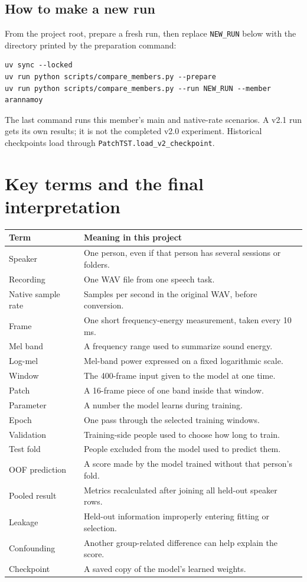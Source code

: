 \documentclass[11pt,a4paper]{article}
\begin{document}
\subsection*{How to make a new run}
From the project root, prepare a fresh run, then replace \texttt{NEW\_RUN} below
with the directory printed by the preparation command:
{\small
\begin{verbatim}
uv sync --locked
uv run python scripts/compare_members.py --prepare
uv run python scripts/compare_members.py --run NEW_RUN --member arannamoy
\end{verbatim}
}
The last command runs this member's main and native-rate scenarios. A v2.1 run
gets its own results; it is not the completed v2.0 experiment. Historical
checkpoints load through \texttt{PatchTST.load\_v2\_checkpoint}.

\clearpage
\section{Key terms and the final interpretation}
\begin{center}
\begin{tabularx}{\linewidth}{@{}L{3.0cm}Y@{}}
\toprule
Term & Meaning in this project\\
\midrule
Speaker & One person, even if that person has several sessions or folders.\\
Recording & One WAV file from one speech task.\\
Native sample rate & Samples per second in the original WAV, before conversion.\\
Frame & One short frequency-energy measurement, taken every 10 ms.\\
Mel band & A frequency range used to summarize sound energy.\\
Log-mel & Mel-band power expressed on a fixed logarithmic scale.\\
Window & The 400-frame input given to the model at one time.\\
Patch & A 16-frame piece of one band inside that window.\\
Parameter & A number the model learns during training.\\
Epoch & One pass through the selected training windows.\\
Validation & Training-side people used to choose how long to train.\\
Test fold & People excluded from the model used to predict them.\\
OOF prediction & A score made by the model trained without that person's fold.\\
Pooled result & Metrics recalculated after joining all held-out speaker rows.\\
Leakage & Held-out information improperly entering fitting or selection.\\
Confounding & Another group-related difference can help explain the score.\\
Checkpoint & A saved copy of the model's learned weights.\\
\bottomrule
\end{tabularx}
\end{center}
\end{document}
